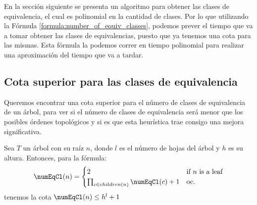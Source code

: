 
En la sección siguiente se presenta un algoritmo para obtener las clases de equivalencia, el cual es polinomial en la cantidad de clases. Por lo que utilizando la Fórmula \ref{formula:number_of_equiv_classes}, podemos prever el tiempo que va a tomar obtener las clases de equivalencias, puesto que ya tenemos una cota para las mismas. Esta fórmula la podemos correr en tiempo polinomial para realizar una aproximación del tiempo que va a tardar. %
\begin{comment}
	Hay un caso que no estamos considerando, y es cuando los nodos no relacionados tienen ancestros. Pero ese es el mismo caso para el cual \emph{no pudimos encontrar una respuesta} en el conteo de los ordenes topológicos. En este caso, sería fácil solucionarlo, ya que solo necesitarías conectar $r_0$ a la nueva raíz del subárbol. El problema surge si el subárbol tiene múltiples raíces, entonces la fórmula que definimos anteriormente no sería suficiente, porque estaría contando algunos escenarios dos veces.    
	Al final no lo agregué, no suma tanto. 
\end{comment}

\subsection{Cota superior para las clases de equivalencia}

Queremos encontrar una cota superior para el número de clases de equivalencia de un árbol, para ver si el número de clases de equivalencia será menor que los posibles órdenes topológicos y si es que esta heurística trae consigo una mejora significativa. 

\begin{lemma}\label{lemma:upper_bound_equivalence_classes}
	Sea  $T$ un árbol con su raíz $n$, donde $l$ es el número de hojas del árbol y $h$ es su altura. Entonces, para la fórmula: 
	\[
	\numEqCl(n) = 
	\begin{cases} 
		2 & \text{if $n$ is a leaf} \\
		\prod_{c \in children(n)} \numEqCl(c) + 1 & \text{oc.}
	\end{cases}
	\]
	tenemos la cota $\numEqCl(n) \leq h^l + 1$
	
\end{lemma}

